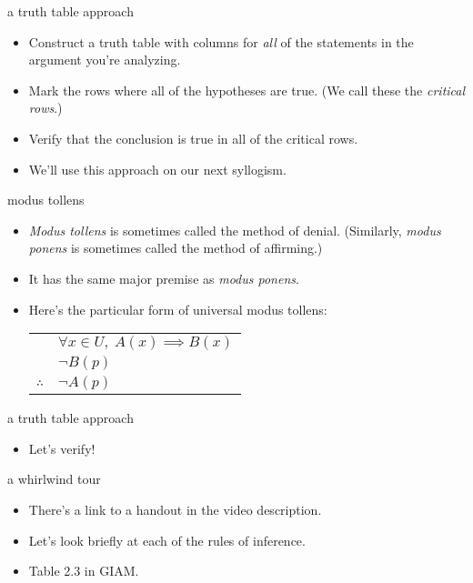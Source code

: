 \documentclass[landscape]{beamer}
\begin{document}
\begin{frame}{a truth table approach}
\begin{itemize}
\item Construct a truth table with columns for {\em all} of the statements in the argument you're analyzing. \pause
\item Mark the rows where all of the hypotheses are true. \pause (We call these the {\em critical rows}.) \pause
\item Verify that the conclusion is true in all of the critical rows. \pause
\item We'll use this approach on our next syllogism.
\end{itemize}
\end{frame}

\begin{frame}{modus tollens}
\begin{itemize}
\item {\em Modus tollens} is sometimes called the method of denial. \pause \newline
(Similarly, {\em modus ponens} is sometimes called the method of affirming.) \pause
\item It has the same major premise as {\em modus ponens}. \pause
\item Here's the particular form of universal modus tollens: \pause \newline

\begin{center}
\begin{tabular}{cl}
 & $ \forall x \in U, \; A(x) \implies B(x)$ \\
 & $\lnot B(p)$  \\ \hline
$\therefore$ & $ \lnot A(p)$\\
\end{tabular}
\end{center}

\end{itemize}
\end{frame}

\begin{frame}{a truth table approach}
\begin{itemize}
\item Let's verify!
\end{itemize}
\end{frame}

\begin{frame}{a whirlwind tour}
\begin{itemize}
\item There's a link to a handout in the video description. \pause
\item Let's look briefly at each of the rules of inference. \pause
\item Table 2.3 in GIAM.
\end{itemize}
\end{frame}
\end{document}

